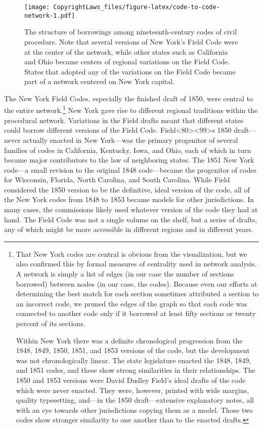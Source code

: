 \documentclass[12pt,]{article}
\let\rmarkdownfootnote\footnote%
\def\footnote{\protect\rmarkdownfootnote}
\begin{document}
\begin{figure}
\centering
\texttt{[image: CopyrightLaws\_files/figure-latex/code-to-code-network-1.pdf]}
\caption{The structure of borrowings among nineteenth-century codes of
civil procedure. Note that several versions of New York's Field Code
were at the center of the network, while other states such as California
and Ohio became centers of regional variations on the Field Code. States
that adopted any of the variations on the Field Code became part of a
network centered on New York capital.}
\end{figure}

The New York Field Codes, especially the finished draft of 1850, were
central to the entire network.\footnote{That New York codes are central
  is obvious from the visualization, but we also confirmed this by
  formal measures of centrality used in network analysis. A network is
  simply a list of edges (in our case the number of sections borrowed)
  between nodes (in our case, the codes). Because even our efforts at
  determining the best match for each section sometimes attributed a
  section to an incorrect code, we pruned the edges of the graph so that
  each code was connected to another code only if it borrowed at least
  fifty sections or twenty percent of its sections.

  Within New York there was a definite chronological progression from
  the 1848, 1849, 1850, 1851, and 1853 versions of the code, but the
  development was not chronologically linear. The state legislature
  enacted the 1848, 1849, and 1851 codes, and these show strong
  similarities in their relationships. The 1850 and 1853 versions were
  David Dudley Field's ideal drafts of the code which were never
  enacted. They were, however, printed with wide margins, quality
  typesetting, and---in the 1850 draft---extensive explanatory notes,
  all with an eye towards other jurisdictions copying them as a model.
  Those two codes show stronger similarity to one another than to the
  enacted drafts.} New York gave rise to different regional traditions
within the procedural network. Variations in the Field drafts meant that
different states could borrow different versions of the Field Code.
Field\textless80\textgreater\textless99\textgreater s 1850 draft---never
actually enacted in New York---was the primary progenitor of several
families of codes in California, Kentucky, Iowa, and Ohio, each of which
in turn became major contributors to the law of neighboring states. The
1851 New York code---a small revision to the original 1848 code---became
the progenitor of codes for Wisconsin, Florida, North Carolina, and
South Carolina. While Field considered the 1850 version to be the
definitive, ideal version of the code, all of the New York codes from
1848 to 1853 became models for other jurisdictions. In many cases, the
commissions likely used whatever version of the code they had at hand.
The Field Code was not a single volume on the shelf, but a series of
drafts, any of which might be more accessible in different regions and
in different years.
\end{document}
